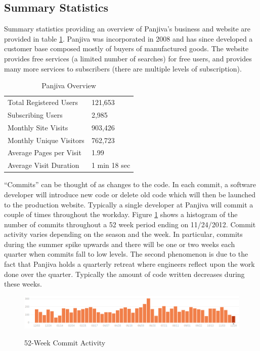 \documentclass[12pt]{article}
\begin{document}
\subsection{Summary Statistics}

Summary statistics providing an overview of Panjiva's business and website are provided in table \ref{table:panjiva-overview}. Panjiva was incorporated in 2008 and has since developed a customer base composed mostly of buyers of manufactured goods. The website provides free services (a limited number of searches) for free users, and provides many more services to subscribers (there are multiple levels of subscription). 

\begin{table}[h!]
\centering
\caption{Panjiva Overview}
\begin{tabular}{l || l}
\hline
Total Registered Users & 121,653 \\
Subscribing Users & 2,985 \\
Monthly Site Visits & 903,426 \\
Monthly Unique Visitors & 762,723 \\
Average Pages per Visit & 1.99 \\
Average Visit Duration & 1 min 18 sec \\
\hline
\end{tabular}
\label{table:panjiva-overview}
\end{table}

``Commits'' can be thought of as changes to the code. In each commit, a software developer will introduce new code or delete old code which will then be launched to the production website. Typically a single developer at Panjiva will commit a couple of times throughout the workday. Figure \ref{fig:commit-history} shows a histogram of the number of commits throughout a 52 week period ending on 11/24/2012. Commit activity varies depending on the season and the week. In particular, commits during the summer spike upwards and there will be one or two weeks each quarter when commits fall to low levels. The second phenomenon is due to the fact that Panjiva holds a quarterly retreat where engineers reflect upon the work done over the quarter. Typically the amount of code written decreases during these weeks. 

\begin{figure}[h!]
\centering
\caption{52-Week Commit Activity}
\includegraphics[width=5in]{pictures/commit-activity.png}
\label{fig:commit-history}
\end{figure}
\end{document}
